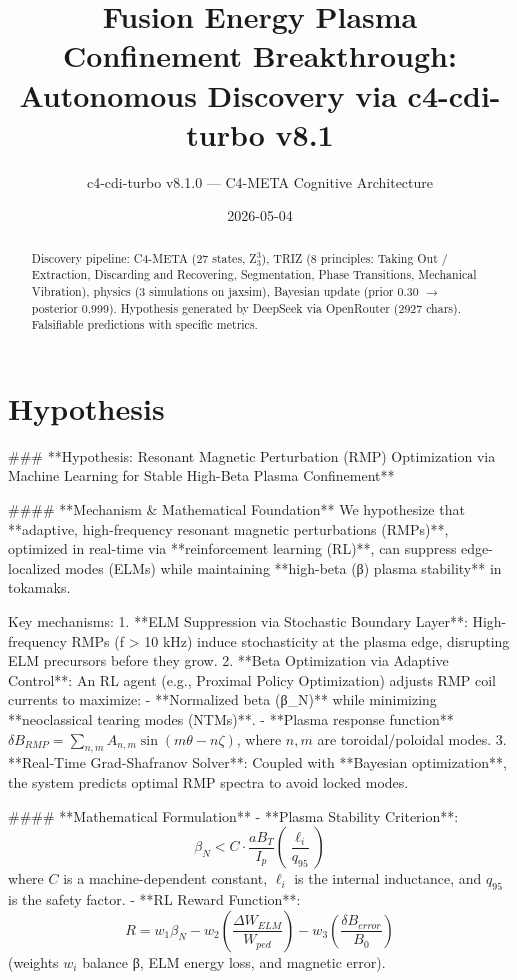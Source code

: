 \documentclass[12pt]{article}
\title{Fusion Energy Plasma Confinement Breakthrough: Autonomous Discovery via c4-cdi-turbo v8.1}
\author{c4-cdi-turbo v8.1.0 — C4-META Cognitive Architecture}
\date{2026-05-04}
\begin{document}
\maketitle
\begin{abstract}
Discovery pipeline: C4-META (27 states, Z$_3^3$), TRIZ (8 principles: Taking Out / Extraction, Discarding and Recovering, Segmentation, Phase Transitions, Mechanical Vibration), 
physics (3 simulations on jaxsim), Bayesian update (prior 0.30 $\rightarrow$ posterior 0.999).
Hypothesis generated by DeepSeek via OpenRouter (2927 chars). 
Falsifiable predictions with specific metrics.
\end{abstract}
\section{Hypothesis}
### **Hypothesis: Resonant Magnetic Perturbation (RMP) Optimization via Machine Learning for Stable High-Beta Plasma Confinement**  

#### **Mechanism & Mathematical Foundation**  
We hypothesize that **adaptive, high-frequency resonant magnetic perturbations (RMPs)**, optimized in real-time via **reinforcement learning (RL)**, can suppress edge-localized modes (ELMs) while maintaining **high-beta (β) plasma stability** in tokamaks.  

Key mechanisms:  
1. **ELM Suppression via Stochastic Boundary Layer**: High-frequency RMPs (f > 10 kHz) induce stochasticity at the plasma edge, disrupting ELM precursors before they grow.  
2. **Beta Optimization via Adaptive Control**: An RL agent (e.g., Proximal Policy Optimization) adjusts RMP coil currents to maximize:  
   - **Normalized beta (β_N)** while minimizing **neoclassical tearing modes (NTMs)**.  
   - **Plasma response function** \( \delta B_{RMP} = \sum_{n,m} A_{n,m} \sin(mθ - nζ) \), where \( n,m \) are toroidal/poloidal modes.  
3. **Real-Time Grad-Shafranov Solver**: Coupled with **Bayesian optimization**, the system predicts optimal RMP spectra to avoid locked modes.  

#### **Mathematical Formulation**  
- **Plasma Stability Criterion**:  
  \[  
  \beta_N < C \cdot \frac{a B_T}{I_p} \left( \frac{\ell_i}{q_{95}} \right)  
  \]  
  where \( C \) is a machine-dependent constant, \( \ell_i \) is the internal inductance, and \( q_{95} \) is the safety factor.  
- **RL Reward Function**:  
  \[  
  R = w_1 \beta_N - w_2 \left( \frac{\Delta W_{ELM}}{W_{ped}} \right) - w_3 \left( \frac{\delta B_{error}}{B_0} \right)  
  \]  
  (weights \( w_i \) balance β, ELM energy loss, and magnetic error).  
\end{document}
